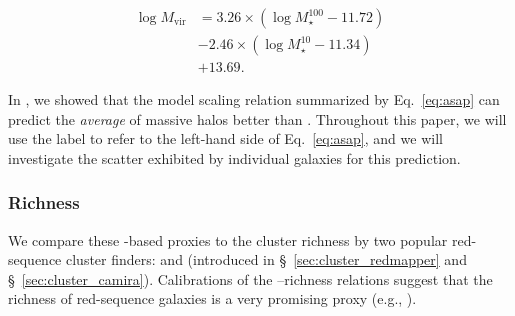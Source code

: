 \documentclass[fleqn,usenatbib,useAMS]{mnras}
\begin{document}
    \begin{equation}
        \begin{aligned}
        \log M_{\mathrm{vir}} &=3.26 \times\left(\log M_{\star}^{100}-11.72\right) \\
        &-2.46 \times\left(\log M_{\star}^{10}-11.34\right) \\
        &+13.69.
        \end{aligned}
        \label{eq:asap}
    \end{equation}

    In \citealt{Huang2020}, we showed that the \asap{} model scaling relation summarized by
    Eq.~\ref{eq:asap} can predict the {\em average} \mvir{} of massive halos better than
    . 
    Throughout this paper, we will use the label \masap{} to refer to the left-hand side of
    Eq.~\ref{eq:asap}, and we will investigate the scatter exhibited by individual galaxies for this
    \asap{} prediction.



\subsubsection{Richness}
    \label{sec:proxy_richness}

    We compare these \mstar{}-based proxies to the cluster richness by two popular red-sequence
    cluster finders: \redm{} and \camira{} (introduced in \S\ \ref{sec:cluster_redmapper} and \S\
    \ref{sec:cluster_camira}).
    Calibrations of the \mvir{}--richness relations suggest that the richness of red-sequence
    galaxies is a very promising \mvir{} proxy (e.g., \citealt{Melchior2017, Murata2018,
    McClintock2019}).
    
\end{document}
